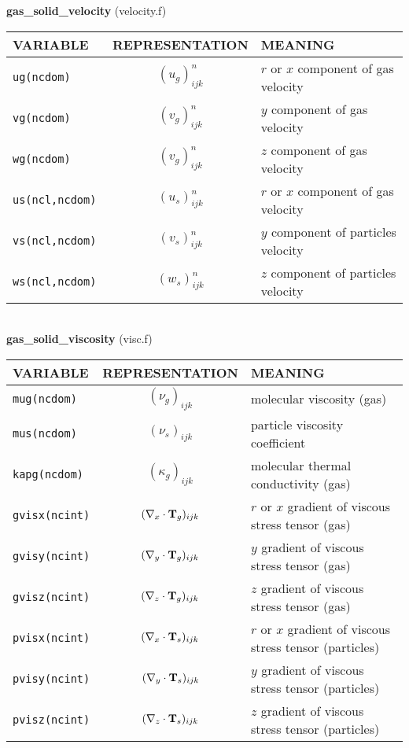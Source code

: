 %
%
{\large {\bf gas\_solid\_velocity}} (velocity.f)\\[5mm]
\begin{tabular}{|p{6cm}|c|p{6cm}|}\hline
VARIABLE & REPRESENTATION & MEANING\\\hline
\tt ug(ncdom) & $(u_g)^n_{ijk}$ &   $r$ or $x$ component of gas velocity\\\hline
\tt vg(ncdom) & $(v_g)^n_{ijk}$ &  $y$ component of gas velocity\\\hline
\tt wg(ncdom) & $(v_g)^n_{ijk}$ &  $z$ component of gas velocity\\\hline
\tt us(ncl,ncdom) & $(u_s)^n_{ijk}$ &   $r$ or $x$ component of gas velocity\\\hline
\tt vs(ncl,ncdom) & $(v_s)^n_{ijk}$ &  $y$ component of particles velocity\\\hline
\tt ws(ncl,ncdom) & $(w_s)^n_{ijk}$ &  $z$ component of particles velocity\\\hline
\end{tabular}\\[5mm]
%
%
{\large{\bf gas\_solid\_viscosity}} (visc.f)\\[5mm]
\begin{tabular}{|p{6cm}|c|p{6cm}|}\hline
VARIABLE & REPRESENTATION & MEANING\\\hline
\tt mug(ncdom)& $(\nu_g)_{ijk}$ &   molecular viscosity (gas)\\\hline
\tt mus(ncdom)& $(\nu_s)_{ijk}$ &   particle viscosity coefficient \\\hline
\tt kapg(ncdom)& $(\kappa_g)_{ijk}$ &   molecular thermal conductivity (gas)\\\hline
\tt gvisx(ncint)& $(\nabla_x\cdot{\bf T}_g)_{ijk}$ & $r$ or $x$ gradient of viscous stress tensor (gas)\\\hline
\tt gvisy(ncint)& $(\nabla_y\cdot{\bf T}_g)_{ijk}$&  $y$ gradient of viscous stress tensor (gas)\\\hline
\tt gvisz(ncint)& $(\nabla_z\cdot{\bf T}_g)_{ijk}$&  $z$ gradient of viscous stress tensor (gas)\\\hline
\tt pvisx(ncint)& $(\nabla_x\cdot{\bf T}_s)_{ijk}$&  $r$ or $x$ gradient of viscous stress tensor (particles)\\\hline
\tt pvisy(ncint)& $(\nabla_y\cdot{\bf T}_s)_{ijk}$&  $y$ gradient of viscous stress tensor (particles)\\\hline
\tt pvisz(ncint)& $(\nabla_z\cdot{\bf T}_s)_{ijk}$&  $z$ gradient of viscous stress tensor (particles)\\\hline
\end{tabular}\\
